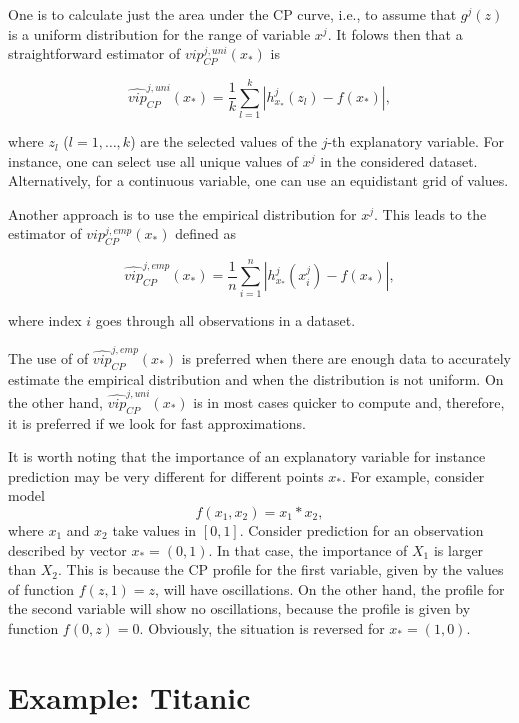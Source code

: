 \documentclass[]{krantz}
\begin{document}
One is to calculate just the area under the CP curve, i.e., to assume that \(g^j(z)\) is a uniform distribution for the range of variable \(x^j\). It folows then that a straightforward estimator of \(vip_{CP}^{j,uni}(x_*)\) is

\begin{equation}
\widehat{vip}_{CP}^{j,uni}(x_*) = \frac 1k \sum_{l=1}^k |h^{j}_{x_*}(z_l) - f(x_*)|,
\label{eq:VIPCPuni}
\end{equation}

where \(z_l\) (\(l=1, \ldots, k\)) are the selected values of the \(j\)-th explanatory variable. For instance, one can select use all unique values of \(x^{j}\) in the considered dataset. Alternatively, for a continuous variable, one can use an equidistant grid of values.

Another approach is to use the empirical distribution for \(x^{j}\). This leads to the estimator of \(vip_{CP}^{j,emp}(x_*)\) defined as

\begin{equation}
\widehat{vip}_{CP}^{j,emp}(x_*) = \frac 1n \sum_{i=1}^n |h^{j}_{x_*}(x^{j}_i) - f(x_*)|,
\label{eq:VIPCPemp}
\end{equation}

where index \(i\) goes through all observations in a dataset.

The use of of \(\widehat{vip}_{CP}^{j,emp}(x_*)\) is preferred when there are enough data to accurately estimate the empirical distribution and when the distribution is not uniform. On the other hand, \(\widehat{vip}_{CP}^{j,uni}(x_*)\) is in most cases quicker to compute and, therefore, it is preferred if we look for fast approximations.

It is worth noting that the importance of an explanatory variable for instance prediction may be very different for different points \(x_*\). For example, consider model
\[
f(x_1, x_2) = x_1 * x_2,
\]
where \(x_1\) and \(x_2\) take values in \([0,1]\). Consider prediction for an observation described by vector \(x_* = (0,1)\). In that case, the importance of \(X_1\) is larger than \(X_2\). This is because the CP profile for the first variable, given by the values of function \(f(z,1)=z\), will have oscillations. On the other hand, the profile for the second variable will show no oscillations, because the profile is given by function \(f(0,z)=0\). Obviously, the situation is reversed for \(x_*=(1,0)\).

\hypertarget{CPOscExample}{%
\section{Example: Titanic}\label{CPOscExample}}
\end{document}
